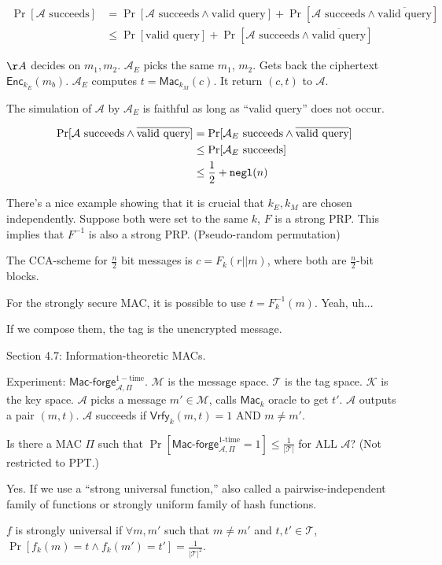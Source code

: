 \documentclass[12pt]{article}
\newcommand{\AAA}{\mathcal{A}}
\newcommand{\KKK}{\mathcal{K}}
\newcommand{\MMM}{\mathcal{M}}
\newcommand{\TTT}{\mathcal{T}}
\newcommand{\Enc}{\mathsf{Enc}}
\newcommand{\Mac}{\mathsf{Mac}}
\newcommand{\Macf}{\mathsf{Mac\text{-}forge}}
\newcommand{\Vrfy}{\mathsf{Vrfy}}
\newcommand{\negl}{{\tt negl}}
\begin{document}
\begin{align*}
\Pr[\AAA\text{ succeeds}]&=\Pr[\AAA\text{ succeeds}\wedge\text{valid query}]+\Pr[\AAA\text{ succeeds}\wedge\overline{\text{valid query}}]\\
&\leq\Pr[\text{valid query}] + \Pr[\AAA\text{ succeeds}\wedge\overline{\text{valid query}}]
\end{align*}

$\AA$ decides on $m_1,m_2$. $\AAA_E$ picks the same $m_1$, $m_2$. Gets back the ciphertext $\Enc_{k_E}(m_b)$. $\AAA_E$ computes $t=\Mac_{k_M}(c)$. It return $(c,t)$ to $\AAA$.

The simulation of $\AAA$ by $\AAA_E$ is faithful as long as ``valid query'' does not occur.

\begin{align*}
\Pr[\AAA\text{ succeeds}\wedge\overline{\text{valid query}}]&=\Pr[\AAA_E\text{ succeeds}\wedge\overline{\text{valid query}}]\\
&\leq\Pr[\AAA_E\text{ succeeds}]\\
&\leq\frac{1}{2}+\negl(n)
\end{align*}

There's a nice example showing that it is crucial that $k_E, k_M$ are chosen independently. Suppose both were set to the same $k$, $F$ is a strong PRP. This implies that $F^{-1}$ is also a strong PRP. (Pseudo-random permutation)

The CCA-scheme for $\frac{n}{2}$ bit messages is $c=F_k(r||m)$, where both are $\frac{n}{2}$-bit blocks.

For the strongly secure MAC, it is possible to use $t=F^{-1}_k(m)$. Yeah, uh...

If we compose them, the tag is the unencrypted message.

Section 4.7: Information-theoretic MACs.

Experiment: $\Macf_{\AAA,\Pi}^{1-\text{time}}$. $\MMM$ is the message space. $\TTT$ is the tag space. $\KKK$ is the key space. $\AAA$ picks a message $m'\in\MMM$, calls $\Mac_k$ oracle to get $t'$. $\AAA$ outputs a pair $(m,t)$. $\AAA$ succeeds if $\Vrfy_k(m,t)=1$ AND $m\neq m'$.

Is there a MAC $\Pi$ such that $\Pr[\Macf_{\AAA,\Pi}^{1\text{-time}}=1]\leq\frac{1}{|\TTT|}$ for ALL $\AAA$? (Not restricted to PPT.)

Yes. If we use a ``strong universal function,'' also called a pairwise-independent family of functions or strongly uniform family of hash functions.

$f$ is strongly universal if $\forall m,m'$ such that $m\neq m'$ and $t,t'\in\TTT$, $\Pr[f_k(m)=t\wedge f_k(m')=t']=\frac{1}{|\TTT|^2}$.
\end{document}
